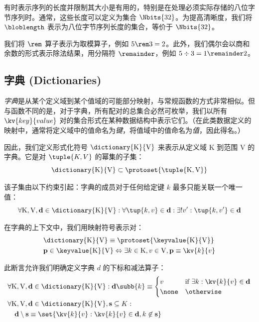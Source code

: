 有时表示序列的长度并限制其大小是有用的，特别是在处理必须实际存储的八位字节序列时。通常，这些长度可以定义为集合 $\Nbits{32}$。为提高清晰度，我们将 $\bloblength$ 表示为八位字节序列长度的集合，等价于 $\Nbits{32}$。

我们将 $\rem$ 算子表示为取模算子，例如 $5 \rem 3 = 2$。此外，我们偶尔会以商和余数的形式表示除法结果，用分隔符 $\remainder$，例如 $5 \div 3 = 1 \remainder 2$。

\subsection{字典 (Dictionaries)}\label{sec:dictionaries}

\emph{字典}是从某个定义域到某个值域的可能部分映射，与常规函数的方式非常相似。但与函数不同的是，对于字典，所有配对的总集合必然可枚举，我们以所有 $\kv{key}{value}$ 对的集合形式在某种数据结构中表示它们。（在此类数据定义的映射中，通常将定义域中的值命名为\emph{键}，将值域中的值命名为\emph{值}，因此得名。）

因此，我们定义形式化符号 $\dictionary{\mathrm{K}}{\mathrm{V}}$ 来表示从定义域 $\mathrm{K}$ 到范围 $\mathrm{V}$ 的字典。它是对 $\tuple{K, V}$ 的幂集的子集：
\begin{equation}
  \dictionary{\mathrm{K}}{\mathrm{V}} \subset \protoset{\tuple{\mathrm{K}, \mathrm{V}}}
\end{equation}

该子集由以下约束引起：字典的成员对于任何给定键 $k$ 最多只能关联一个唯一值：
\begin{equation}
  \forall \mathrm{K}, \mathrm{V}, \mathbf{d} \in \dictionary{\mathrm{K}}{\mathrm{V}} : \forall \tup{k, v} \in \mathbf{d} : \exists! v' : \tup{k, v'} \in \mathbf{d}
\end{equation}

在字典的上下文中，我们用映射符号表示对：
\begin{align}
  &\dictionary{\mathrm{K}}{\mathrm{V}} \equiv \protoset{\keyvalue{\mathrm{K}}{\mathrm{V}}}\\
  &\mathbf{p} \in \keyvalue{\mathrm{K}}{\mathrm{V}} \Leftrightarrow \exists k \in \mathrm{K}, v \in \mathrm{V}, \mathbf{p} \equiv \kv{k}{v}
\end{align}

此断言允许我们明确定义字典 $d$ 的下标和减法算子：
\begin{align}
  &\forall \mathrm{K}, \mathrm{V}, \mathbf{d} \in \dictionary{\mathrm{K}}{\mathrm{V}}: \mathbf{d}\subb{k} \equiv \begin{cases}
    v & \text{if}\ \exists k : \kv{k}{v} \in \mathbf{d} \\
    \none & \otherwise
  \end{cases}\\
  &\begin{aligned}
    &\forall \mathrm{K}, \mathrm{V}, \mathbf{d} \in \dictionary{\mathrm{K}}{\mathrm{V}}, \mathbf{s} \subseteq K:\\
    &\quad \mathbf{d} \setminus \mathbf{s} \equiv \set{ \kv{k}{v}: \kv{k}{v} \in \mathbf{d}, k \not\in \mathbf{s} }
  \end{aligned}
\end{align}

